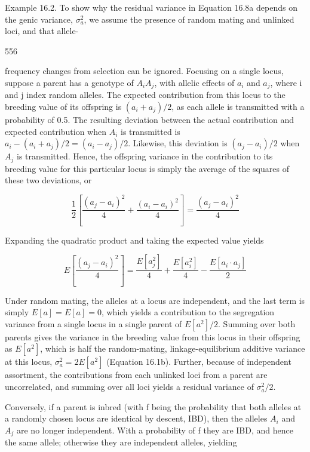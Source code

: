 \documentclass{article}
\begin{document}
Example 16.2. To show why the residual variance in Equation 16.8a depends on the genic variance,  $ \sigma_{a}^{2} $, we assume the presence of random mating and unlinked loci, and that allele-

556

frequency changes from selection can be ignored. Focusing on a single locus, suppose a parent has a genotype of  $ A_i A_j $, with allelic effects of  $ a_i $ and  $ a_j $, where i and j index random alleles. The expected contribution from this locus to the breeding value of its offspring is  $ (a_i + a_j)/2 $, as each allele is transmitted with a probability of 0.5. The resulting deviation between the actual contribution and expected contribution when  $ A_i $ is transmitted is  $ a_i - (a_i + a_j)/2 = (a_i - a_j)/2 $. Likewise, this deviation is  $ (a_j - a_i)/2 $ when  $ A_j $ is transmitted. Hence, the offspring variance in the contribution to its breeding value for this particular locus is simply the average of the squares of these two deviations, or

\begin{equation}
\frac{1}{2}\left[\frac{(a_{j}-a_{i})^{2}}{4}+\frac{(a_{i}-a_{i})^{2}}{4}\right]=\frac{(a_{j}-a_{i})^{2}}{4}
\end{equation}

Expanding the quadratic product and taking the expected value yields

\begin{equation}
E\left[\frac{(a_{j}-a_{i})^{2}}{4}\right]=\frac{E[a_{j}^{2}]}{4}+\frac{E[a_{i}^{2}]}{4}-\frac{E[a_{i}\cdot a_{j}]}{2}
\end{equation}

Under random mating, the alleles at a locus are independent, and the last term is simply  $ E[a] = E[a] = 0 $, which yields a contribution to the segregation variance from a single locus in a single parent of  $ E[a^2]/2 $. Summing over both parents gives the variance in the breeding value from this locus in their offspring as  $ E[a^2] $, which is half the random-mating, linkage-equilibrium additive variance at this locus,  $ \sigma_a^2 = 2E[a^2] $ (Equation 16.1b). Further, because of independent assortment, the contributions from each unlinked loci from a parent are uncorrelated, and summing over all loci yields a residual variance of  $ \sigma_a^2/2 $.

Conversely, if a parent is inbred (with f being the probability that both alleles at a randomly chosen locus are identical by descent, IBD), then the alleles  $ A_{i} $ and  $ A_{j} $ are no longer independent. With a probability of f they are IBD, and hence the same allele; otherwise they are independent alleles, yielding
\end{document}
